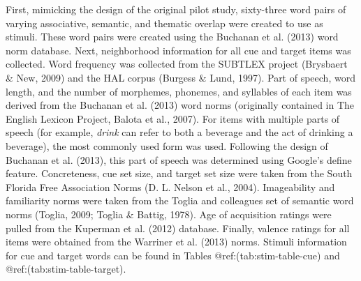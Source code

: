 \documentclass[english,man]{apa6}
\theoremstyle{definition}
\theoremstyle{definition}
\theoremstyle{definition}
\theoremstyle{remark}
\begin{document}
First, mimicking the design of the original pilot study, sixty-three
word pairs of varying associative, semantic, and thematic overlap were
created to use as stimuli. These word pairs were created using the
Buchanan et al. (2013) word norm database. Next, neighborhood
information for all cue and target items was collected. Word frequency
was collected from the SUBTLEX project (Brysbaert \& New, 2009) and the
HAL corpus (Burgess \& Lund, 1997). Part of speech, word length, and the
number of morphemes, phonemes, and syllables of each item was derived
from the Buchanan et al. (2013) word norms (originally contained in The
English Lexicon Project, Balota et al., 2007). For items with multiple
parts of speech (for example, \emph{drink} can refer to both a beverage
and the act of drinking a beverage), the most commonly used form was
used. Following the design of Buchanan et al. (2013), this part of
speech was determined using Google's define feature. Concreteness, cue
set size, and target set size were taken from the South Florida Free
Association Norms (D. L. Nelson et al., 2004). Imageability and
familiarity norms were taken from the Toglia and colleagues set of
semantic word norms (Toglia, 2009; Toglia \& Battig, 1978). Age of
acquisition ratings were pulled from the Kuperman et al. (2012)
database. Finally, valence ratings for all items were obtained from the
Warriner et al. (2013) norms. Stimuli information for cue and target
words can be found in Tables @ref:(tab:stim-table-cue) and
@ref:(tab:stim-table-target).
\end{document}
